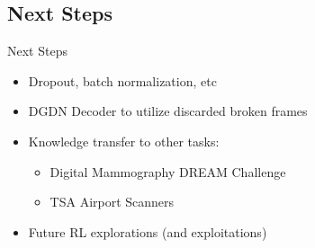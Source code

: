 \documentclass[11pt]{beamer}
\begin{document}
	\subsection{Next Steps}
	\begin{frame}{Next Steps}
		\begin{itemize}
			\item Dropout, batch normalization, etc
			\item DGDN Decoder to utilize discarded broken frames
			\item Knowledge transfer to other tasks: 
			\begin{itemize}
				\item Digital Mammography DREAM Challenge
				\item TSA Airport Scanners
			\end{itemize}
			\item Future RL explorations (and exploitations)
		\end{itemize}
	\end{frame}
	
\end{document}
